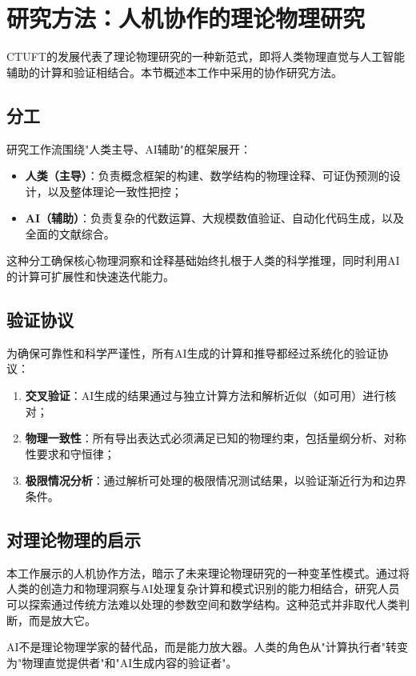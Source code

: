 \section{研究方法：人机协作的理论物理研究}
\label{sec:ai_methodology}

CTUFT的发展代表了理论物理研究的一种新范式，即将人类物理直觉与人工智能辅助的计算和验证相结合。本节概述本工作中采用的协作研究方法。

\subsection{分工}

研究工作流围绕"人类主导、AI辅助"的框架展开：

\begin{itemize}
    \item \textbf{人类（主导）}：负责概念框架的构建、数学结构的物理诠释、可证伪预测的设计，以及整体理论一致性把控；
    
    \item \textbf{AI（辅助）}：负责复杂的代数运算、大规模数值验证、自动化代码生成，以及全面的文献综合。
\end{itemize}

这种分工确保核心物理洞察和诠释基础始终扎根于人类的科学推理，同时利用AI的计算可扩展性和快速迭代能力。

\subsection{验证协议}

为确保可靠性和科学严谨性，所有AI生成的计算和推导都经过系统化的验证协议：

\begin{enumerate}
    \item \textbf{交叉验证}：AI生成的结果通过与独立计算方法和解析近似（如可用）进行核对；
    
    \item \textbf{物理一致性}：所有导出表达式必须满足已知的物理约束，包括量纲分析、对称性要求和守恒律；
    
    \item \textbf{极限情况分析}：通过解析可处理的极限情况测试结果，以验证渐近行为和边界条件。
\end{enumerate}

\subsection{对理论物理的启示}

本工作展示的人机协作方法，暗示了未来理论物理研究的一种变革性模式。通过将人类的创造力和物理洞察与AI处理复杂计算和模式识别的能力相结合，研究人员可以探索通过传统方法难以处理的参数空间和数学结构。这种范式并非取代人类判断，而是放大它。

\begin{insight}[人机协作研究]
AI不是理论物理学家的替代品，而是能力放大器。人类的角色从"计算执行者"转变为"物理直觉提供者"和"AI生成内容的验证者"。
\end{insight}

